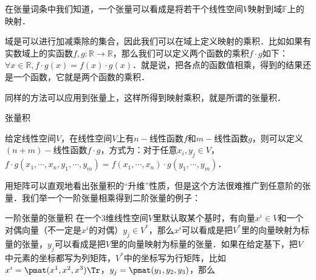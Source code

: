 
在张量词条中我们知道，一个张量可以看成是将若干个线性空间$V$映射到域$\mathbb{F}$上的映射．

域是可以进行加减乘除的集合，因此我们可以在域上定义映射的乘积．比如如果有实数域上的实函数$f, g:\mathbb{R}\rightarrow\mathbb{R}$，那么我们可以定义两个函数的乘积$f\cdot g$如下：$\forall x\in\mathbb{R}, f\cdot g(x)=f(x)\cdot g(x)$．就是说，把各点的函数值相乘，得到的结果还是一个函数，它就是两个函数的乘积．

同样的方法可以应用到张量上，这样所得到映射乘积，就是所谓的张量积．

\begin{definition}{张量积}

给定线性空间$V$，在线性空间$V$上有$n-$线性函数$f$和$m-$线性函数$g$，则可以定义$(n+m)-$线性函数$f\cdot g$，方式为：对于任意$x_i, y_j\in V$，$f\cdot g(x_1, \cdots, x_n, y_1, \cdots, y_m)=f(x_1, \cdots, x_n)\cdot g(y_1, \cdots, y_m)$．

\end{definition}

用矩阵可以直观地看出张量积的“升维”性质，但是这个方法很难推广到任意阶的张量．我们举一个一阶张量相乘得到二阶张量的例子：

\begin{example}{一阶张量的张量积}
在一个$3$维线性空间$V$里默认取某个基时，有向量$x^i\in V$和一个对偶向量（不一定是$x^i$的对偶）$y_j\in V^*$，那么$x^i$可以看成是把$V^*$里的向量映射为标量的张量，$y_j$可以看成是把$V$里的向量映射为标量的张量．如果在给定基下，把$V$中元素的坐标都写为列矩阵，$V^*$中的坐标写为行矩阵，比如$x^i=\pmat(x^1, x^2, x^3)\Tr$，$y_j=\pmat(y_1, y_2, y_3)$，那么
\end{example}




